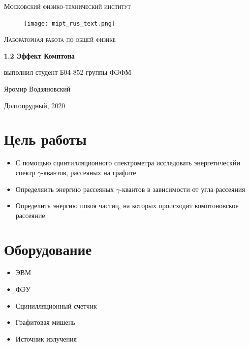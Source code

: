 \documentclass[a4paper]{article}
\begin{document}
\newcommand{\apple}{\char"F8FF}

\begin{titlepage}
	\centering
	\vspace{5cm}
    {\scshape\LARGE Московский физико-технический институт\par}
    
\begin{figure}[H]
\begin{center}
\texttt{[image: mipt\_rus\_text.png]}
\label{default}
\end{center}
\end{figure}

	\vspace{3cm}
	{\scshape\Large Лабораторная работа по общей физике \par}
	\vspace{1cm}
	{\huge\bfseries  1.2 Эффект Комптона \par}
	\vspace{1cm}
	\vfill
\begin{flushright}
	{\large выполнил студент Б04-852 группы ФЭФМ}\par
	\vspace{0.3cm}
	{\LARGE Яромир Водзяновский}
\end{flushright}
	
	\vfill
Долгопрудный, 2020
\end{titlepage}

\tableofcontents

\newpage

\section{Цель работы}
\begin{itemize}
    \item С помощью сцинтилляционного спектрометра исследовать энергетическйи спектр
    $\gamma$-квантов, рассеяных на графите
    \item Определяить энергию рассеяных $\gamma$-квантов в зависимости от угла рассеяния
    \item Определить энергию покоя частиц, на которых происходит комптоновское рассеяние
\end{itemize}

\section{Оборудование}

\begin{itemize}
    \item ЭВМ
    \item ФЭУ
    \item Сцинилляционный счетчик
    \item Графитовая мишень
    \item Источник излучения
\end{itemize}
\end{document}
